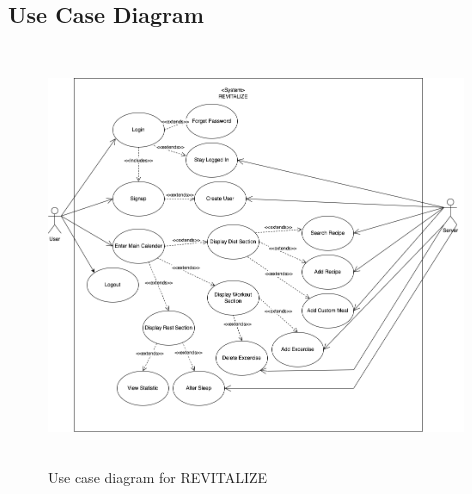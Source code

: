 \documentclass[12pt,letterpaper]{article}
\begin{document}
\subsection{Use Case Diagram}
\begin{figure}[H]
\centering
\includegraphics[width=11cm, height=11cm]{4G06SRSUseCaseDiagram.png}
\caption{Use case diagram for REVITALIZE}
\end{figure}
\end{document}
